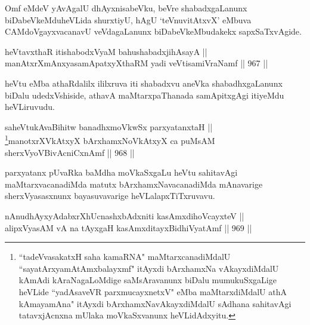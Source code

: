 
\begin{artha}
Omf eMdeV yAvAgalU dhAyxnisabeVku, beVre shabadxgaLanunx biDabeVkeMduheVLida shurxtiyU, hAgU `teV\s nuvitAtxvX' eMbuva CAMdoVgayxvacanavU veVdagaLanunx biDabeVkeMbudakekx sapxSaTxvAgide.
\end{artha}


\begin{shl}
heVtavxthaR itishabodxV\s yaM bahushabadxjihAsayA || \\
manAtxrXmAnxyasamApatxyXthaRM yadi veVtisamiVraNamf \hfill || 967 ||  
\end{shl}

\begin{artha}
heVtu eMba athaRdalilx ililxruva iti shabadxvu aneVka shabadhxgaLanunx biDalu udedxVshiside, athavA maMtarxpaThanada samApitxgAgi itiyeMdu heVLiruvudu.
\end{artha}


\begin{shl}
saheVtukAvaBihitw banadhxmoVkwSx parxyatanxtaH || \\
\footnote{``tadeVvasakatxH saha kamaRNA" maMtarxcanadiMdalU ``sayatArxyamAtAmx\s balayxmf" itAyxdi bArxhamxNa vAkayxdiMdalU kAmAdi kAraNagaLoMdige saMsAravanunx biDalu mumukuSxgaLige heVLide ``yadAsaveVR parxmucayxnetxV" eMba maMtarxdiMdalU athA kAmayamAna" itAyxdi bArxhamxNavAkayxdiMdalU sAdhana sahitavAgi tatavxjAcnxna mUlaka moVkaSxvanunx heVLidAdxyitu.}manotxrXVkAtxyX bArxhamxNoVkAtxyX ca puMsAM sherxVyoVBivAcniCxnAmf \hfill || 968 ||  
\end{shl}


\begin{artha}
parxyatanx pUvaRka baMdha moVkaSxgaLu heVtu sahitavAgi maMtarxvacanadiMda matutx bArxhamxNavacanadiMda mAnavarige sherxVyasasxnunx bayasuvavarige heVLalapxTiTxruvavu.
\end{artha}


\begin{shl}
nAnudhAyxyAdabxrXhUcnashxbAdxniti kasAmxdihoVcayxteV || \\
alipxVyasAM vA na tAyxgaH kasAmxditayxBidhiVyatAmf \hfill || 969 ||  
\end{shl}

